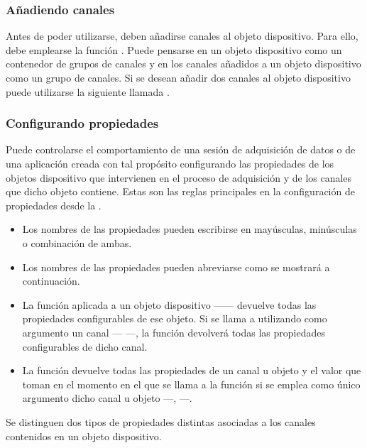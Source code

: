 \subsubsection{Añadiendo canales}

Antes de poder utilizarse, deben añadirse canales al objeto dispositivo.
Para ello, debe emplearse la función . Puede pensarse en
un objeto dispositivo como un contenedor de grupos de canales y en los
canales añadidos a un objeto dispositivo como un grupo de canales. Si se
desean añadir dos canales al objeto dispositivo  puede
utilizarse la siguiente llamada .


\subsubsection{Configurando propiedades}

Puede controlarse el comportamiento de una sesión de adquisición de datos o
de una aplicación creada con tal propósito configurando las propiedades de
los objetos dispositivo que intervienen en el proceso de adquisición y de
los canales que dicho objeto contiene. Estas son las reglas principales en
la configuración de propiedades desde la \datx{}.

\begin{itemize}
	\item Los nombres de las propiedades pueden escribirse en
		mayúsculas, minúsculas o combinación de ambas.
	\item Los nombres de las propiedades pueden abreviarse como se
		mostrará a continuación. %
	\item La función  aplicada a un objeto dispositivo
		------ devuelve todas las propiedades
		configurables de ese objeto. Si se llama a 
		utilizando como argumento un canal ---
		---, la función devolverá todas las
		propiedades configurables de dicho canal.
	\item La función  devuelve todas las propiedades de un
		canal u objeto y el valor que toman en el momento en el que
		se llama a la función si se emplea como único argumento
		dicho canal u objeto ---,
		---.  \end{itemize}

Se distinguen dos tipos de propiedades distintas asociadas a los canales
contenidos en un objeto dispositivo.

